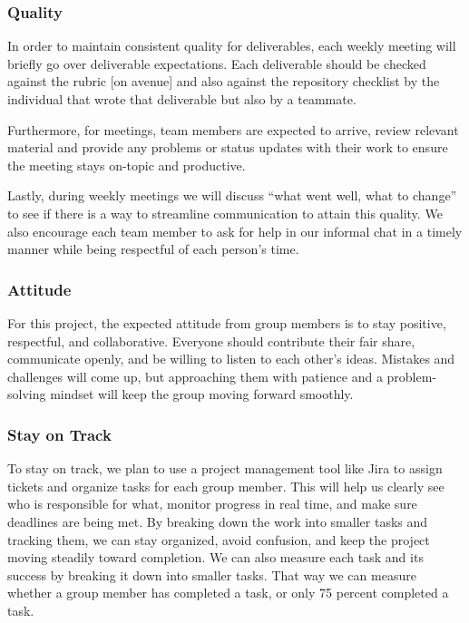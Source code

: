 \documentclass{article}
\begin{document}
\subsubsection*{Quality} 

In order to maintain consistent quality for deliverables, each weekly meeting will briefly go over 
deliverable expectations. Each deliverable should be checked against the rubric [on avenue] and also 
against the repository checklist by the individual that wrote that deliverable but also by a teammate. 


Furthermore, for meetings, team members are expected to arrive, review relevant material and provide 
any problems or status updates with their work to ensure the meeting stays on-topic and productive.

Lastly, during weekly meetings we will discuss “what went well, what to change” to see if there is a 
way to streamline communication to attain this quality. We also encourage each team member to ask for 
help in our informal chat in a timely manner while being respectful of each person's time.


\subsubsection*{Attitude}

For this project, the expected attitude from group members is to stay positive, respectful, and collaborative. Everyone should
contribute their fair share, communicate openly, and be willing to listen to each other’s ideas. Mistakes and challenges will
come up, but approaching them with patience and a problem-solving mindset will keep the group moving forward smoothly.

\subsubsection*{Stay on Track}

To stay on track, we plan to use a project management tool like Jira to assign tickets and organize tasks for each group member.
This will help us clearly see who is responsible for what, monitor progress in real time, and make sure deadlines are being met.
By breaking down the work into smaller tasks and tracking them, we can stay organized, avoid confusion, and keep the project
moving steadily toward completion. We can also measure each task and its success by breaking it down into smaller tasks. That
way we can measure whether a group member has completed a task, or only 75 percent completed a task. 
\end{document}
